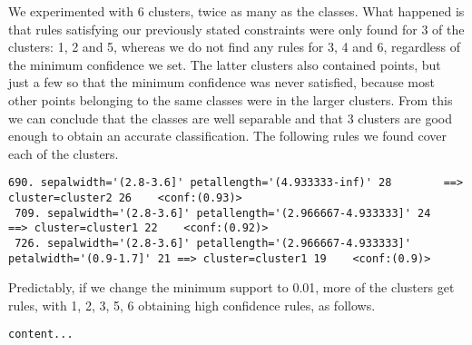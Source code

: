 \documentclass[]{article}
\begin{document}
We experimented with 6 clusters, twice as many as the classes. What happened is that rules satisfying our previously stated constraints were only found for 3 of the clusters: 1, 2 and 5, whereas we do not find any rules for 3, 4 and 6, regardless of the minimum confidence we set. The latter clusters also contained points, but just a few so that the minimum confidence was never satisfied, because most other points belonging to the same classes were in the larger clusters. From this we can conclude that the classes are well separable and that 3 clusters are good enough to obtain an accurate classification. The following rules we found cover each of the clusters.

\begin{lstlisting}[breaklines=true]
 690. sepalwidth='(2.8-3.6]' petallength='(4.933333-inf)' 28 		==> cluster=cluster2 26    <conf:(0.93)>
 709. sepalwidth='(2.8-3.6]' petallength='(2.966667-4.933333]' 24 	==> cluster=cluster1 22    <conf:(0.92)> 
 726. sepalwidth='(2.8-3.6]' petallength='(2.966667-4.933333]' petalwidth='(0.9-1.7]' 21 ==> cluster=cluster1 19    <conf:(0.9)>
\end{lstlisting}

Predictably, if we change the minimum support to 0.01, more of the clusters get rules, with 1, 2, 3, 5, 6 obtaining high confidence rules, as follows.

\begin{lstlisting}[breaklines=true]
content...
\end{lstlisting}
\end{document}

